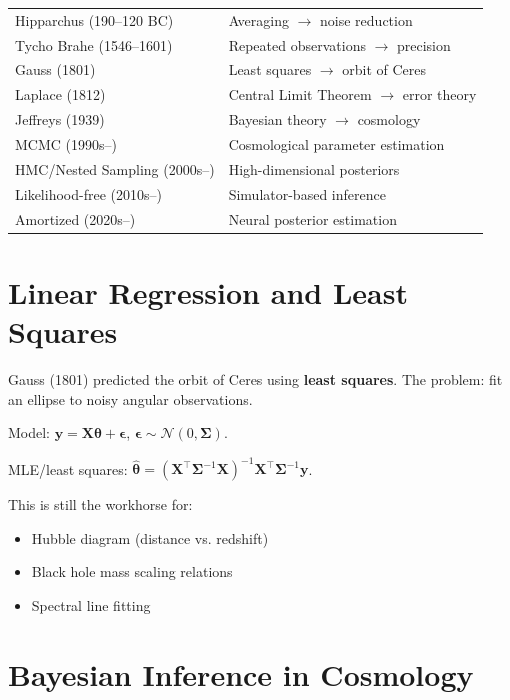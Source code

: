 \begin{center}
\begin{tabular}{ll}
Hipparchus (190--120 BC) & Averaging $\to$ noise reduction \\
Tycho Brahe (1546--1601) & Repeated observations $\to$ precision \\
Gauss (1801) & Least squares $\to$ orbit of Ceres \\
Laplace (1812) & Central Limit Theorem $\to$ error theory \\
Jeffreys (1939) & Bayesian theory $\to$ cosmology \\ \cite{desouza2025astronomy}
MCMC (1990s--) & Cosmological parameter estimation \\
HMC/Nested Sampling (2000s--) & High-dimensional posteriors \\
Likelihood-free (2010s--) & Simulator-based inference \\ \cite{desouza2025astronomy}
Amortized (2020s--) & Neural posterior estimation
\end{tabular}
\end{center}

\section{Linear Regression and Least Squares}
\label{sec:astro:leastsq}

Gauss (1801) predicted the orbit of Ceres using \textbf{least squares}. The problem: fit an ellipse to noisy angular observations.

Model: $\bm{y} = \bm{X}\bm{\theta} + \bm{\epsilon}$, $\bm{\epsilon} \sim \mathcal{N}(0, \bm{\Sigma})$.

MLE/least squares: $\hat{\bm{\theta}} = (\bm{X}^\top \bm{\Sigma}^{-1} \bm{X})^{-1} \bm{X}^\top \bm{\Sigma}^{-1} \bm{y}$.

This is still the workhorse for:
\begin{itemize}
    \item Hubble diagram (distance vs. redshift)
    \item Black hole mass scaling relations
    \item Spectral line fitting
\end{itemize}

\section{Bayesian Inference in Cosmology} \cite{desouza2025astronomy}
\label{sec:astro:bayes}

